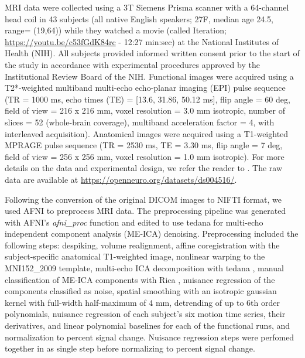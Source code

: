 MRI data were collected using a 3T Siemens Prisma scanner with a 64-channel head
coil in 43 subjects (all native English speakers; 27F, median age 24.5, range=
(19,64)) while they watched a movie (called Iteration;
\url{https://youtu.be/c53fGdK84rc} - 12:27 min:sec) at the National Institutes
of Health (NIH). All subjects provided informed written consent prior to the
start of the study in accordance with experimental procedures approved by the
Institutional Review Board of the NIH. Functional images were acquired using a
T2*-weighted multiband multi-echo echo-planar imaging (EPI) pulse sequence (TR =
1000 ms, echo times (TE) = [13.6, 31.86, 50.12 ms], flip angle = 60 deg, field
of view = 216 x 216 mm, voxel resolution = 3.0 mm isotropic, number of slices =
52 (whole-brain coverage), multiband acceleration factor = 4, with interleaved
acquisition). Anatomical images were acquired using a T1-weighted MPRAGE pulse
sequence (TR = 2530 ms, TE = 3.30 ms, flip angle = 7 deg, field of view = 256 x
256 mm, voxel resolution = 1.0 mm isotropic). For more details on the data and
experimental design, we refer the reader to
\citep{SavaSegal2022Individualvariabilityneural}. The raw data are available at
\url{https://openneuro.org/datasets/ds004516/}.

Following the conversion of the original DICOM images to NIFTI format, we used
AFNI \citep{Cox1996AFNISoftwareAnalysis} to preprocess MRI data. The
preprocessing pipeline was generated with AFNI's \textit{afni\_proc} function
and edited to use tedana \citep{TedanaCommunity2022MEICA/tedana0.0.12,
DuPre2021TEdependentanalysis} for multi-echo independent component analysis
(ME-ICA) denoising. Preprocessing included the following steps: despiking,
volume realignment, affine coregistration with the subject-specific anatomical
T1-weighted image, nonlinear warping to the MNI152\_2009 template, multi-echo
ICA decomposition with tedana \citep{TedanaCommunity2022MEICA/tedana0.0.12,
DuPre2021TEdependentanalysis}, manual classification of ME-ICA components with
Rica \citep{Urunuela2023MEICA/ricav1.0.17}, nuisance regression of the
components classified as noise, spatial smoothing with an isotropic gaussian
kernel with full-width half-maximum of 4 mm, detrending of up to 6th order
polynomials, nuisance regression of each subject's six motion time series, their
derivatives, and linear polynomial baselines for each of the functional runs,
and normalization to percent signal change. Nuisance regression steps were
perfomed together in as single step before normalizing to percent signal change.

